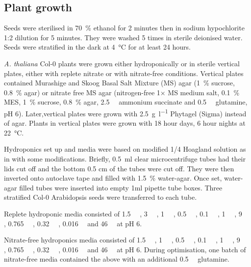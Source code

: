 \subsection{Plant growth}{\label{plant-growth}}

Seeds were sterilised in \SI{70}{\percent} ethanol for 2 minutes then in sodium
hypochlorite 1:2 dilution for 5 minutes. They were washed 5 times in
sterile deionised water. Seeds were stratified in the dark at
\SI{4}{\degreeCelsius} for at least 24 hours.

\textit{A. thaliana} Col-0 plants were grown either hydroponically or in sterile vertical plates, either with replete nitrate or with
nitrate\hyp{}free conditions. Vertical plates contained Murashige and Skoog
Basal Salt Mixture (MS) agar (\SI{1}{\percent} sucrose, \SI{0.8}{\percent} agar) or nitrate free
MS agar (nitrogen\hyp{}free 1× MS medium salt, \SI{0.1}{\percent} MES, \SI{1}{\percent} sucrose, \SI{0.8}{\percent} agar, \SI{2.5}{\milli\Molar} ammonium succinate and \SI{0.5}{\milli\Molar} glutamine, pH 6). Later,vertical plates were grown with \SI{2.5}{\gram\per\l} Phytagel (Sigma) instead of agar. Plants in vertical plates were grown with 18 hour days, 6 hour nights at \SI{22}{\degreeCelsius}.

Hydroponics set up and media were based on modified 1/4 Hoagland
solution as in \textcite*{connProtocolOptimisingHydroponic2013} with some modifications. Briefly, \SI{0.5}{\ml} clear microcentrifuge tubes had their lids cut off and the bottom 0.5 cm of the tubes were cut off. They were then inverted onto autoclave tape and filled with \SI{1.5}{\percent} water\hyp{}agar. Once set, water\hyp{}agar filled tubes were inserted into empty 1ml pipette tube boxes. Three stratified Col-0 Arabidopsis seeds were transferred to each tube.

Replete hydroponic media consisted of \SI{1.5}{\milli\Molar} , \SI{3}{\milli\Molar} , \SI{1}{\milli\Molar}
, \SI{0.5}{\milli\Molar} , \SI{0.1}{\milli\Molar} , \SI{1}{\milli\Molar}
, \SI{9}{\micro\Molar} ,
\SI{0.765}{\micro\Molar} , \SI{0.32}{\micro\Molar} , \SI{0.016}{\micro\Molar}  and \SI{46}{\micro\Molar}  at pH 6.

Nitrate\hyp{}free hydroponics media consisted of \SI{1.5}{\milli\Molar} , \SI{1}{\milli\Molar} , \SI{0.5}{\milli\Molar} \-, \SI{0.1}{\milli\Molar} , \SI{1}{\milli\Molar} , \SI{9}{\micro\Molar} , \SI{0.765}{\micro\Molar} , \SI{0.32}{\micro\Molar} , \SI{0.016}{\micro\Molar}  and \SI{46}{\micro\Molar}  at pH 6. During optimisation, one batch of nitrate\hyp{}free media contained the above with an additional \SI{0.5}{\milli\Molar} glutamine.

